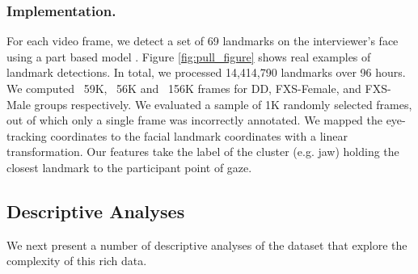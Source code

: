 \documentclass{llncs}
\begin{document}
\subsubsection{ Implementation.} For each video frame, we detect a set of 69 landmarks on the interviewer's face using a part based model \cite{dpmface}. Figure \ref{fig:pull_figure} shows real examples of landmark detections. In total, we processed 14,414,790 landmarks over 96 hours. We computed ~59K, ~56K and ~156K frames for DD, FXS-Female, and FXS-Male groups respectively. We evaluated a sample of 1K randomly selected frames, out of which only a single frame was incorrectly annotated. We mapped the eye-tracking coordinates to the facial landmark coordinates with a linear transformation. Our features take the label of the cluster (e.g. jaw) holding the closest landmark to the participant point of gaze. 

\vspace{-2 em}
\subsection{Descriptive Analyses}
\vspace{-1 em}
We next present a number of descriptive analyses of the dataset that explore the complexity of this rich data.%
\vspace{-1 em}
\end{document}
